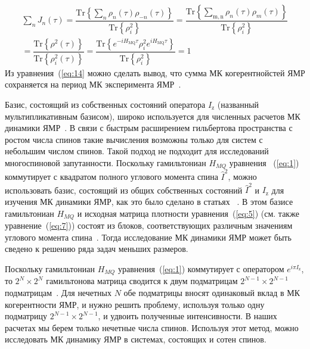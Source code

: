 \documentclass[review]{elsarticle}
\begin{document}
%
\begin{multline}
    \label{eq:14}
    \sum\limits_{n} J_{n}(\tau)
    = \dfrac{
        \mathrm{Tr} \left\{
            \sum_{n} \rho_{n}(\tau) \rho_{-n}(\tau)
        \right\}}
    {\mathrm{Tr} \left\{ \rho^2_{i} \right\}} 
    = \dfrac{
        \mathrm{Tr} \left\{
            \sum_{\mathrm{m,n}} \rho_n(\tau)\rho_m(\tau)
    \right\}}
    {\mathrm{Tr} \left\{\rho^2_{i}\right\}}
    \\
    = \dfrac{
        \mathrm{Tr}\left\{\rho^2(\tau)\right\}
    }
    {
        \mathrm{Tr}\left\{\rho^2_{i}(\tau)\right\}
    }
    = \dfrac{
        \mathrm{Tr} \left\{ 
            e^{-i H_\mathrm{MQ} \tau} 
            \rho^{2}_{i}
            e^{i H_\mathrm{MQ} \tau} 
        \right\}
    }
    {
        \mathrm{Tr} \left\{ \rho_{i}^{2} \right\}
    } 
    = 1
\end{multline}
%
Из уравнения~(\ref{eq:14} можно сделать вывод, что сумма МК когерентнойстей ЯМР сохраняется на период МК эксперимента ЯМР~\cite{Baum_1985}.

Базис, состоящий из собственных состояний оператора $I_\mathrm{z}$ (названный мультипликативным базисом), широко используется для численных расчетов МК динамики ЯМР~\cite{Zhang_2009}.
В связи с быстрым расширением гильбертова пространства с ростом числа спинов такие вычисления возможны только для систем с небольшим числом спинов.
Такой подход не подходит для исследований многоспиновой запутанности.
Поскольку гамильтониан $H_{MQ}$ уравнения ~(\ref{eq:1}) коммутирует с квадратом полного углового момента спина $\hat I^2$, 
можно использовать базис, состоящий из общих собственных состояний $\hat I^2$ и $I_\mathrm{z}$ для изучения МК динамики ЯМР, как это было сделано в статьях ~\cite{Doronin_2009,Doronin_2011,Doronin_2019}.
В этом базисе гамильтониан $H_{MQ}$ и исходная матрица плотности уравнения~(\ref{eq:5}) (см. также уравнение~(\ref{eq:7})) состоят из блоков, соответствующих различным значениям углового момента спина~\cite{Doronin_2009}.
Тогда исследование МК динамики ЯМР может быть сведено к решению ряда задач меньших размеров.

Поскольку гамильтониан $H_{MQ}$ уравнения~(\ref{eq:1}) коммутирует с оператором $e^{i\pi I_\mathrm{z}}$, то $2^N \times 2^N$ гамильтонова матрица сводится к двум подматрицам $2^{N-1} \times 2^{N-1}$ подматрицам~\cite{Doronin_2009}.
Для нечетных $N$ обе подматрицы вносят одинаковый вклад в МК когерентности ЯМР, и нужно решить проблему, используя только одну подматрицу $2^{N-1} \times 2^{N-1}$, и удвоить полученные интенсивности.
В наших расчетах мы берем только нечетные числа спинов.
Используя этот метод, можно исследовать МК динамику ЯМР в системах, состоящих и сотен спинов.
\end{document}
